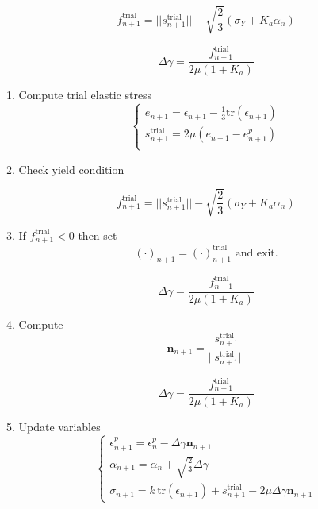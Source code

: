 \documentclass[conference, onecolumn]{IEEEtran}
\begin{document}
\begin {equation}
f_{n+1}^{\text{trial}} = || s_{n+1}^{\text{trial}} || - \sqrt{\frac{2}{3}} (\sigma_{Y} + K_{a} \alpha_{n} )
\end {equation}

\begin {equation}
\Delta \gamma = \frac{f_{n+1}^{\text{trial}}}{2\mu(1+K_{a})}
\end {equation}

1. Compute trial elastic stress
\begin {equation}
\left\{
\begin{array}{ll}
e_{n+1} = \epsilon_{n+1} - \frac{1}{3} \text{tr}( \epsilon_{n+1} ) \\[5pt]
s_{n+1}^{\text{trial}} = 2\mu( e_{n+1} - e_{n+1}^{p} ) \\[5pt]
\end{array}
\right.
\end {equation}

2. Check yield condition

\begin {equation}
f_{n+1}^{\text{trial}} = || s_{n+1}^{\text{trial}} || - \sqrt{\frac{2}{3}} (\sigma_{Y} + K_{a} \alpha_{n} )
\end {equation}

3. If $f_{n+1}^{\text{trial}} < 0$ then set
\begin {equation}
(\cdot)_{n+1} = (\cdot)_{n+1}^{\text{trial}} \text{ and exit.}
\end {equation}

\begin {equation}
\Delta \gamma = \frac{f_{n+1}^{\text{trial}}}{2\mu(1+K_{a})}
\end {equation}

4. Compute
\begin {equation}
\mathbf{n}_{n+1} = \frac{s_{n+1}^{\text{trial}}}{|| s_{n+1}^{\text{trial}} ||}
\end {equation}

\begin {equation}
\Delta \gamma = \frac{f_{n+1}^{\text{trial}}}{2\mu(1+K_{a})}
\end {equation}

5. Update variables
\begin {equation}
\left\{
\begin{array}{ll}
\epsilon_{n+1}^{p} = \epsilon_{n}^{p} - \Delta \gamma  \mathbf{n}_{n+1} \\[5pt]
\alpha_{n+1} = \alpha_{n} + \sqrt{\frac{2}{3}} \Delta \gamma \\[5pt]
\sigma_{n+1} = k \, \text{tr} (\epsilon_{n+1}) + s_{n+1}^{\text{trial}} - 2 \mu \Delta \gamma \mathbf{n}_{n+1} 
\end{array}
\right.
\end {equation}
\end{document}
